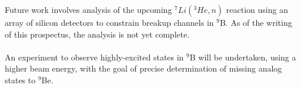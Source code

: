 \documentclass[11pt,copyright]{fsuthesis}
\begin{document}
Future work involves analysis of the upcoming $^7Li(^3He,n)$ reaction using an array of silicon detectors to constrain breakup channels in $^9$B. As of the writing of this prospectus, the analysis is not yet complete.  \\
\\
An experiment to observe highly-excited states in $^9$B will be undertaken, using a higher beam energy, with the goal of precise determination of missing analog states to $^9$Be.
\\ \\

\newpage

\printbibliography
\end{document}
